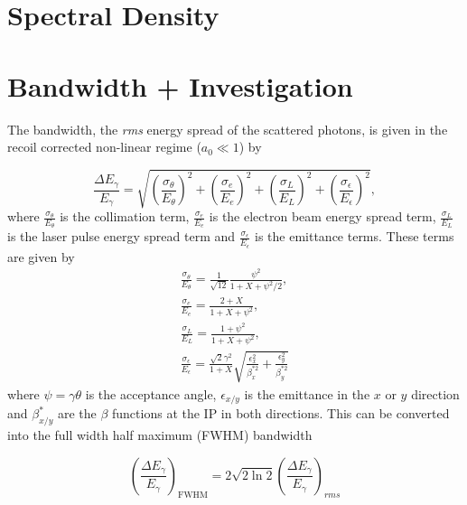 \documentclass[../main.tex]{subfiles}
\begin{document}
\section{Spectral Density}

\section{Bandwidth + Investigation}

The bandwidth, the \textit{rms} energy spread of the scattered photons, is given in the recoil corrected non-linear regime ($a_{0}\ll 1$) \cite{ranjan2018simulation} by

\begin{equation}
\frac{\Delta E_{\gamma}}{E_{\gamma}} = \sqrt{\left(\frac{\sigma_{\theta}}{E_{\theta}}\right)^{2}+\left(\frac{\sigma_{e}}{E_{e}}\right)^{2}+\left(\frac{\sigma_{L}}{E_{L}}\right)^{2}+\left(\frac{\sigma_{\epsilon}}{E_{\epsilon}}\right)^{2}},
\label{eq:RMS_bandwidth}    
\end{equation}
where $\frac{\sigma_{\theta}}{E_{\theta}}$ is the collimation term, $\frac{\sigma_{e}}{E_{e}}$ is the electron beam energy spread term, $\frac{\sigma_{L}}{E_{L}}$ is the laser pulse energy spread term and $\frac{\sigma_{\epsilon}}{E_{\epsilon}}$ is the emittance terms. These terms are given by
\begin{gather}
\frac{\sigma_{\theta}}{E_{\theta}} = \frac{1}{\sqrt{12}}\frac{\psi^{2}}{1+X+\psi^{2}/2},
\label{eq:collimation_term} \\
\frac{\sigma_{e}}{E_{e}} = \frac{2+X}{1+X+\psi^{2}},
\label{eq:beam_energy_spread_term} \\
\frac{\sigma_{L}}{E_{L}} = \frac{1+\psi^{2}}{1+X+\psi^{2}},
\label{eq:laser_energy_spread_term} \\
\frac{\sigma_{\epsilon}}{E_{\epsilon}} = \frac{\sqrt{2}\gamma^{2}}{1+X}\sqrt{\frac{\epsilon_{x}^{2}}{\beta_{x}^{*2}}+\frac{\epsilon_{y}^{2}}{\beta_{y}^{*2}}}
\label{eq:emittance_term}
\end{gather}
where $\psi = \gamma\theta$ is the acceptance angle, $\epsilon_{x/y}$ is the emittance in the $x$ or $y$ direction and $\beta_{x/y}^{*}$ are the $\beta$ functions at the IP in both directions. This can be converted into the full width half maximum (FWHM) bandwidth 

\begin{equation}
\left(\frac{\Delta E_{\gamma}}{E_{\gamma}}\right)_{\mathrm{FWHM}} = 2\sqrt{2\ln{2}}\left(\frac{\Delta E_{\gamma}}{E_{\gamma}}\right)_{rms}
\label{eq:FWHM_bandwidth}
\end{equation}
\end{document}
